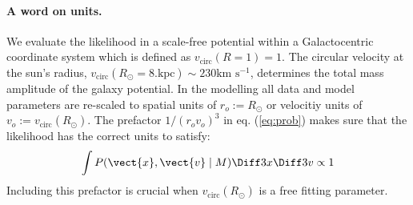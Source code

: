 \paragraph{A word on units.} We evaluate the likelihood in a scale-free potential within a Galactocentric coordinate system which is defined as $v_\text{circ}(R = 1) = 1$. The circular velocity at the sun's radius, $v_\text{circ}(R_\odot = 8. \text{kpc}) \sim 230 \text{km s$^{-1}$}$, determines the total mass amplitude of the galaxy potential. In the modelling all data and model parameters are re-scaled to spatial units of $r_o := R_\odot$ or velocitiy units of $v_o := v_\text{circ}(R_\odot )$. The prefactor $1/\left(r_o v_o\right)^3$ in eq. (\ref{eq:prob}) makes sure that the likelihood has the correct units to satisfy:
\begin{eqnarray*}
\int P(\vect{x},\vect{v} \mid M) \Diff 3 x \Diff 3 v \propto 1
\end{eqnarray*} 
Including this prefactor is crucial when $v_\text{circ}(R_\odot )$ is a free fitting parameter.

